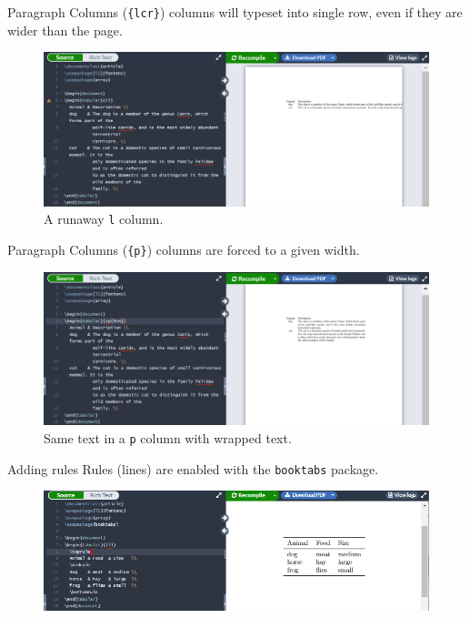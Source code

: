 \documentclass{beamer}
\begin{document}
{  \begin{frame}{Paragraph Columns}
    (\texttt{\{lcr\}}) columns will typeset into single row, even if they are wider than the page.
    \begin{figure}
      \includegraphics[width=0.9\linewidth]{day01-overleaf-11C-table-overflow.png}
      \caption{A runaway \texttt{l} column.}
      \label{fig:day01-overleaf-11C}
    \end{figure}
  \end{frame}

  \begin{frame}{Paragraph Columns}
    (\texttt{\{p\}}) columns are forced to a given width.
    \begin{figure}
      \includegraphics[width=0.9\linewidth]{day01-overleaf-11D-table-overflow.png}
      \caption{Same text in a \texttt{p} column with wrapped text.}
      \label{fig:day01-overleaf-11D}
    \end{figure}
  \end{frame}

  \begin{frame}{Adding rules}
    Rules (lines) are enabled with the \texttt{booktabs} package.
    \begin{figure}
      \includegraphics[width=0.9\linewidth]{day01-overleaf-11E-table-rule.png}
    \end{figure}
  \end{frame}

}
\end{document}
